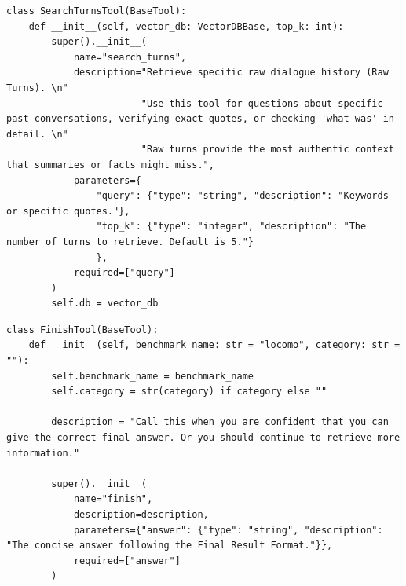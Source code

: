 \documentclass[11pt, a4paper]{lumia}
\begin{document}
\begin{tcolorbox}[title={SearchTurnsTool}, sharp corners, breakable, 
      colframe=Periwinkle, colback=white, 
        boxrule=3pt, boxsep=0.5pt, enhanced, 
        shadow={3pt}{-3pt}{0pt}{opacity=1}]
        \footnotesize
        {\selectfont
\begin{lstlisting}[breaklines=true,showstringspaces=false]
class SearchTurnsTool(BaseTool):
    def __init__(self, vector_db: VectorDBBase, top_k: int):
        super().__init__(
            name="search_turns",
            description="Retrieve specific raw dialogue history (Raw Turns). \n"
                        "Use this tool for questions about specific past conversations, verifying exact quotes, or checking 'what was' in detail. \n"
                        "Raw turns provide the most authentic context that summaries or facts might miss.",
            parameters={
                "query": {"type": "string", "description": "Keywords or specific quotes."},
                "top_k": {"type": "integer", "description": "The number of turns to retrieve. Default is 5."}
                },
            required=["query"]
        )
        self.db = vector_db
\end{lstlisting}
}
\end{tcolorbox}

\begin{tcolorbox}[title={FinishTool}, sharp corners, breakable, 
      colframe=Periwinkle, colback=white, 
        boxrule=3pt, boxsep=0.5pt, enhanced, 
        shadow={3pt}{-3pt}{0pt}{opacity=1}]
        \footnotesize
        {\selectfont
\begin{lstlisting}[breaklines=true,showstringspaces=false]
class FinishTool(BaseTool):
    def __init__(self, benchmark_name: str = "locomo", category: str = ""):
        self.benchmark_name = benchmark_name
        self.category = str(category) if category else ""
        
        description = "Call this when you are confident that you can give the correct final answer. Or you should continue to retrieve more information."
        
        super().__init__(
            name="finish",
            description=description,
            parameters={"answer": {"type": "string", "description": "The concise answer following the Final Result Format."}},
            required=["answer"]
        )
\end{lstlisting}
}
\end{tcolorbox}
\end{document}
